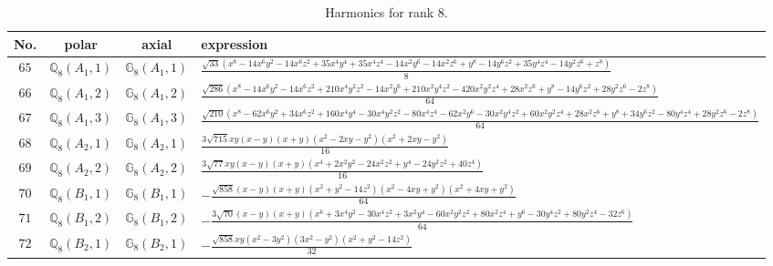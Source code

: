 \documentclass[fleqn,8pt,landscape]{jsarticle}
\begin{document}
\begin{table}[ht!]
\begin{center}
\caption{Harmonics for rank 8.}
\renewcommand{\arraystretch}{1.3}
\begin{tabular}{cccl} \hline \hline
No. & polar & axial & expression \\ \hline
$ 65 $ & $ \mathbb{Q}_{8}(A_{1},1) $ & $ \mathbb{G}_{8}(A_{1},1) $ & $ \frac{\sqrt{33} \left(x^{8} - 14 x^{6} y^{2} - 14 x^{6} z^{2} + 35 x^{4} y^{4} + 35 x^{4} z^{4} - 14 x^{2} y^{6} - 14 x^{2} z^{6} + y^{8} - 14 y^{6} z^{2} + 35 y^{4} z^{4} - 14 y^{2} z^{6} + z^{8}\right)}{8} $ \\
$ 66 $ & $ \mathbb{Q}_{8}(A_{1},2) $ & $ \mathbb{G}_{8}(A_{1},2) $ & $ \frac{\sqrt{286} \left(x^{8} - 14 x^{6} y^{2} - 14 x^{6} z^{2} + 210 x^{4} y^{2} z^{2} - 14 x^{2} y^{6} + 210 x^{2} y^{4} z^{2} - 420 x^{2} y^{2} z^{4} + 28 x^{2} z^{6} + y^{8} - 14 y^{6} z^{2} + 28 y^{2} z^{6} - 2 z^{8}\right)}{64} $ \\
$ 67 $ & $ \mathbb{Q}_{8}(A_{1},3) $ & $ \mathbb{G}_{8}(A_{1},3) $ & $ \frac{\sqrt{210} \left(x^{8} - 62 x^{6} y^{2} + 34 x^{6} z^{2} + 160 x^{4} y^{4} - 30 x^{4} y^{2} z^{2} - 80 x^{4} z^{4} - 62 x^{2} y^{6} - 30 x^{2} y^{4} z^{2} + 60 x^{2} y^{2} z^{4} + 28 x^{2} z^{6} + y^{8} + 34 y^{6} z^{2} - 80 y^{4} z^{4} + 28 y^{2} z^{6} - 2 z^{8}\right)}{64} $ \\
$ 68 $ & $ \mathbb{Q}_{8}(A_{2},1) $ & $ \mathbb{G}_{8}(A_{2},1) $ & $ \frac{3 \sqrt{715} x y \left(x - y\right) \left(x + y\right) \left(x^{2} - 2 x y - y^{2}\right) \left(x^{2} + 2 x y - y^{2}\right)}{16} $ \\
$ 69 $ & $ \mathbb{Q}_{8}(A_{2},2) $ & $ \mathbb{G}_{8}(A_{2},2) $ & $ \frac{3 \sqrt{77} x y \left(x - y\right) \left(x + y\right) \left(x^{4} + 2 x^{2} y^{2} - 24 x^{2} z^{2} + y^{4} - 24 y^{2} z^{2} + 40 z^{4}\right)}{16} $ \\
$ 70 $ & $ \mathbb{Q}_{8}(B_{1},1) $ & $ \mathbb{G}_{8}(B_{1},1) $ & $ - \frac{\sqrt{858} \left(x - y\right) \left(x + y\right) \left(x^{2} + y^{2} - 14 z^{2}\right) \left(x^{2} - 4 x y + y^{2}\right) \left(x^{2} + 4 x y + y^{2}\right)}{64} $ \\
$ 71 $ & $ \mathbb{Q}_{8}(B_{1},2) $ & $ \mathbb{G}_{8}(B_{1},2) $ & $ - \frac{3 \sqrt{70} \left(x - y\right) \left(x + y\right) \left(x^{6} + 3 x^{4} y^{2} - 30 x^{4} z^{2} + 3 x^{2} y^{4} - 60 x^{2} y^{2} z^{2} + 80 x^{2} z^{4} + y^{6} - 30 y^{4} z^{2} + 80 y^{2} z^{4} - 32 z^{6}\right)}{64} $ \\
$ 72 $ & $ \mathbb{Q}_{8}(B_{2},1) $ & $ \mathbb{G}_{8}(B_{2},1) $ & $ - \frac{\sqrt{858} x y \left(x^{2} - 3 y^{2}\right) \left(3 x^{2} - y^{2}\right) \left(x^{2} + y^{2} - 14 z^{2}\right)}{32} $ \\

\end{tabular}
\end{center}
\end{table}
\end{document}
